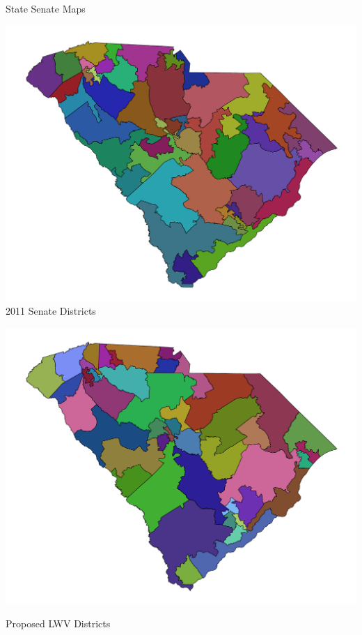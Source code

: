\documentclass[xcolor=dvipsnames,table]{beamer}
\theoremstyle{plain}
\theoremstyle{definition}
\begin{document}
\begin{frame}{State Senate Maps}
\begin{minipage}{0.5\textwidth}
\hspace{-8mm}\includegraphics[scale=0.26]{Senate2011.pdf}
\hspace{25mm}2011 Senate Districts
\end{minipage}%
\begin{minipage}{0.5\textwidth}
\hspace{-5mm}\includegraphics[scale=0.26]{Senate2021.pdf}


\hspace{10mm} Proposed LWV Districts
\end{minipage}
\end{frame}
\end{document}
